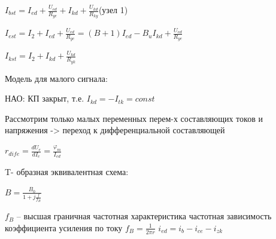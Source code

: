 \documentclass[12pt,a4paper]{article}
\begin{document}
$I_{bst} = I_{ed} +\frac{U_{ed}}{R_{ye}} + I_{kd} + \frac{U_{kd}}{R_{ky}}$(узел 1)

$I_{est} = I_2 + I_{ed}  + \frac{U_{ed}}{R_{ye}}=(B+1)I_{ed} - B_u I_{kd} + \frac{U_{ed}}{R_{ye}}$

$I_{kst} = I_2 + I_{kd}  + \frac{U_{kd}}{R_{yk}}$

Модель для малого сигнала: 

НАО: КП закрыт, т.е. $I_{kd}=-I_{tk}=const$

Рассмотрим только малых переменных перем-х составляющих токов и напряжения -> переход к дифференциальной составляющей
\begin{center}
\begin{figure}[h!]
		\label{VAX2}
	\end{figure}
\end{center}

$r_{dife} = \frac{dU_{e}}{ dI_e }=\frac{\varphi_m}{ I_{ed} }$

T- образная эквивалентная схема:
\begin{center}
\begin{figure}[h!]
		\label{T-obr}
	\end{figure}
\end{center}
$B=\frac{B_0}{1+j\frac{f}{f_B}}$

$f_B$ – высшая граничная частотная характеристика
частотная зависимость коэффициента усиления по току $f_B=\frac{1}{2\pi r}$
$i_{ed} = i_b - i_{ce} - i_{zk}$
\end{document}
